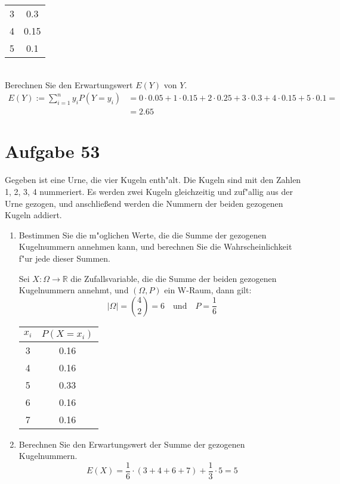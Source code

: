 \documentclass[10pt, oneside]{article}
\begin{document}
\begin{enumerate}
\begin{table*}[h]
\begin{tabular}{c|c}
                3 & 0.3 \\
                4 & 0.15 \\
                5 & 0.1
            \end{tabular}
        \end{table*} \\
        Berechnen Sie den Erwartungswert $E(Y)$ von $Y$.
        \begin{align*}
            E(Y) := \sum_{i = 1}^n y_iP(Y = y_i) &= 0 \cdot 0.05 + 1 \cdot 0.15 + 2 \cdot 0.25 + 3 \cdot 0.3 + 4 \cdot 0.15 + 5 \cdot 0.1 = \\
                                                 &= 2.65
        \end{align*}
\end{enumerate}

\section{Aufgabe 53}

Gegeben ist eine Urne, die vier Kugeln enth"alt. Die Kugeln sind mit den Zahlen
1, 2, 3, 4 nummeriert. Es werden zwei Kugeln gleichzeitig und zuf"allig aus der
Urne gezogen, und anschlie{\ss}end werden die Nummern der beiden gezogenen
Kugeln addiert.
\begin{enumerate}
    \item Bestimmen Sie die m"oglichen Werte, die die Summe der gezogenen
        Kugelnummern annehmen kann, und berechnen Sie die Wahrscheinlichkeit
        f"ur jede dieser Summen.

        Sei $X : \Omega \rightarrow \mathbb{R}$ die Zufallsvariable, die die
        Summe der beiden gezogenen Kugelnummern annehmt, und $(\Omega, P)$ ein
        W-Raum, dann gilt:
        \begin{equation*}
            |\Omega| = \binom{4}{2} = 6 \quad\text{und}\quad P = \dfrac{1}{6}
        \end{equation*}
        \begin{table*}[h]
            \centering
            \begin{tabular}{c|c}
                $x_i$ & $P(X = x_i)$ \\
                \hline
                3 & 0.16 \\
                4 & 0.16 \\
                5 & 0.33 \\
                6 & 0.16 \\
                7 & 0.16 \\
            \end{tabular}
        \end{table*}
    \item Berechnen Sie den Erwartungswert der Summe der gezogenen Kugelnummern.
        \begin{equation*}
            E(X) = \dfrac{1}{6} \cdot (3 + 4 + 6 + 7) + \dfrac{1}{3} \cdot 5 = 5
        \end{equation*}
\end{enumerate}
\end{document}

